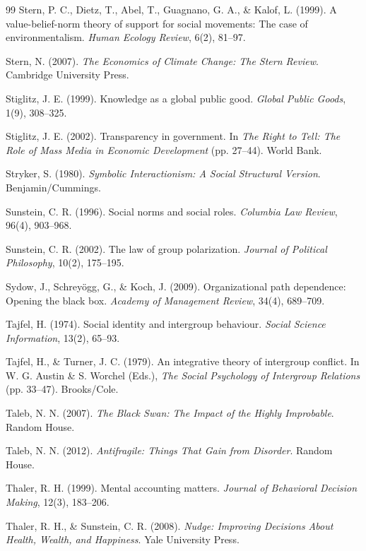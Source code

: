 \begin{thebibliography}{99}
Stern, P. C., Dietz, T., Abel, T., Guagnano, G. A., \& Kalof, L. (1999).
A value-belief-norm theory of support for social movements: The case of environmentalism.
\textit{Human Ecology Review}, 6(2), 81--97.

Stern, N. (2007).
\textit{The Economics of Climate Change: The Stern Review}.
Cambridge University Press.

Stiglitz, J. E. (1999).
Knowledge as a global public good.
\textit{Global Public Goods}, 1(9), 308--325.

Stiglitz, J. E. (2002).
Transparency in government.
In \textit{The Right to Tell: The Role of Mass Media in Economic Development} (pp. 27--44).
World Bank.

Stryker, S. (1980).
\textit{Symbolic Interactionism: A Social Structural Version}.
Benjamin/Cummings.

Sunstein, C. R. (1996).
Social norms and social roles.
\textit{Columbia Law Review}, 96(4), 903--968.

Sunstein, C. R. (2002).
The law of group polarization.
\textit{Journal of Political Philosophy}, 10(2), 175--195.

Sydow, J., Schreyögg, G., \& Koch, J. (2009).
Organizational path dependence: Opening the black box.
\textit{Academy of Management Review}, 34(4), 689--709.

Tajfel, H. (1974).
Social identity and intergroup behaviour.
\textit{Social Science Information}, 13(2), 65--93.

Tajfel, H., \& Turner, J. C. (1979).
An integrative theory of intergroup conflict.
In W. G. Austin \& S. Worchel (Eds.), \textit{The Social Psychology of Intergroup Relations} (pp. 33--47).
Brooks/Cole.

Taleb, N. N. (2007).
\textit{The Black Swan: The Impact of the Highly Improbable}.
Random House.

Taleb, N. N. (2012).
\textit{Antifragile: Things That Gain from Disorder}.
Random House.

Thaler, R. H. (1999).
Mental accounting matters.
\textit{Journal of Behavioral Decision Making}, 12(3), 183--206.

Thaler, R. H., \& Sunstein, C. R. (2008).
\textit{Nudge: Improving Decisions About Health, Wealth, and Happiness}.
Yale University Press.


\end{thebibliography}
